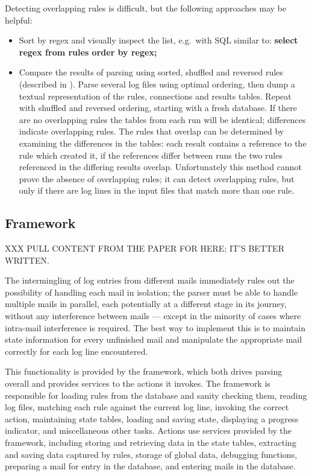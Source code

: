 Detecting overlapping rules is difficult, but the following approaches may
be helpful:

\begin{itemize}

    \item Sort by regex and visually inspect the list, e.g.\ with \gls{SQL}
        similar to: \textbf{select regex from rules order by regex;}

    \item Compare the results of parsing using sorted, shuffled and
        reversed rules (described in ).  Parse several log files using optimal ordering, then
        dump a textual representation of the rules, connections and results
        tables.  Repeat with shuffled and reversed ordering, starting with
        a fresh database.  If there are no overlapping rules the tables
        from each run will be identical; differences indicate overlapping
        rules.  The rules that overlap can be determined by examining the
        differences in the tables: each result contains a reference to the
        rule which created it, if the references differ between runs the
        two rules referenced in the differing results overlap.
        Unfortunately this method cannot prove the absence of overlapping
        rules; it can detect overlapping rules, but only if there are log
        lines in the input files that match more than one rule.

\end{itemize}


\subsection{Framework}

XXX PULL CONTENT FROM THE PAPER FOR HERE\@; IT'S BETTER WRITTEN\@.

\label{framework}

The intermingling of log entries from different mails immediately rules out
the possibility of handling each mail in isolation; the parser must be able
to handle multiple mails in parallel, each potentially at a different stage
in its journey, without any interference between mails --- except in the
minority of cases where intra-mail interference is required.  The best way
to implement this is to maintain state information for every unfinished
mail and manipulate the appropriate mail correctly for each log line
encountered.

This functionality is provided by the framework, which both drives parsing
overall and provides services to the actions it invokes.  The framework is
responsible for loading rules from the database and sanity checking them,
reading log files, matching each rule against the current log line,
invoking the correct action, maintaining state tables, loading and saving
state, displaying a progress indicator, and miscellaneous other tasks.
Actions use services provided by the framework, including storing and
retrieving data in the state tables, extracting and saving data captured by
rules, storage of global data, debugging functions, preparing a mail for
entry in the database, and entering mails in the database.

